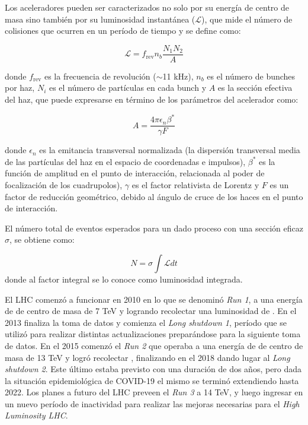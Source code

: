 Los aceleradores pueden ser caracterizados no solo por su energía de centro de masa sino también por su luminosidad instantánea ($\mathcal{L}$), que mide el número de colisiones que ocurren en un período de tiempo y se define como: 

\begin{equation}
\mathcal{L}=f_{\text{rev}}n_{b}\frac{N_{1}N_{2}}{A}
\end{equation}

\noindent
donde $f_{\text{rev}}$ es la frecuencia de revolución ($\sim$11 kHz), $n_{b}$ es el número de bunches por haz, $N_{i}$ es el número de partículas en cada bunch y $A$ es la sección efectiva del haz, que puede expresarse en término de los parámetros del acelerador como:

\begin{equation}
A=\frac{4 \pi \epsilon_{n}\beta^{*}}{\gamma F}
\end{equation} 

\noindent
donde $\epsilon_{n}$ es la emitancia transversal normalizada (la dispersión transversal media de las partículas del  haz en el espacio de coordenadas e impulsos), $\beta^{*}$ es la función de amplitud en el punto de interacción, relacionada al poder de focalización de los cuadrupolos), $\gamma$ es el factor relativista de Lorentz y $F$ es un factor de reducción geométrico, debido al ángulo de cruce de los haces en el punto de interacción.

El número total de eventos esperados para un dado proceso con una sección eficaz $\sigma$, se obtiene como:

\begin{equation}
N=\sigma \int \mathcal{L} dt
\end{equation}	
%
donde al factor integral se lo conoce como luminosidad integrada.

El LHC comenzó a funcionar en 2010 en lo que se denominó \textit{Run 1}, a una energía de de centro de masa de 7 TeV y logrando recolectar una luminosidad de . En el 2013 finaliza la toma de datos y comienza el \textit{Long shutdown 1}, período que se utilizó para realizar distintas actualizaciones preparándose para la siguiente toma de datos. En el 2015 comenzó el \textit{Run 2} que operaba a una energía de de centro de masa de 13 TeV y logró recolectar , finalizando en el 2018 dando lugar al \textit{Long shutdown 2}. Este último estaba previsto con una duración de dos años, pero dada la situación epidemiológica de COVID-19 el mismo se terminó extendiendo hasta 2022.
Los planes a futuro del LHC preveen el \textit{Run 3} a 14 TeV, y luego ingresar en un nuevo período de inactividad para realizar las mejoras necesarias para el \textit{High Luminosity LHC}. 





